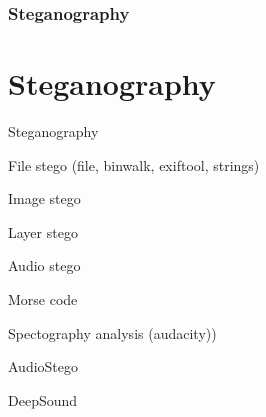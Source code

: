 \section[Section]{Steganography}
\part{Steganography}

\begin{frame}{Steganography}

\end{frame}

\begin{frame}{File stego (file, binwalk, exiftool, strings)}

\end{frame}

\begin{frame}{Image stego}

\end{frame}

\begin{frame}{Layer stego}

\end{frame}

\begin{frame}{Audio stego}

\end{frame}

\begin{frame}{Morse code}

\end{frame}

\begin{frame}{Spectography analysis (audacity))}

\end{frame}

\begin{frame}{AudioStego}

\end{frame}

\begin{frame}{DeepSound}

\end{frame}

